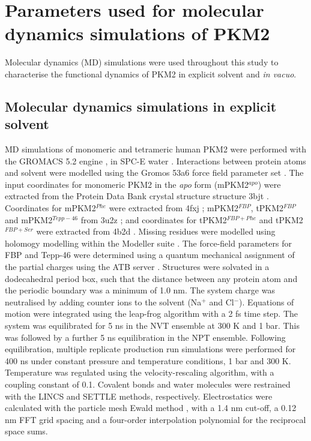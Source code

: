 \section{Parameters used for molecular dynamics simulations of PKM2}
Molecular dynamics (MD) simulations were used throughout this study to characterise the functional dynamics of PKM2 in explicit solvent and \textit{in vacuo}. 

\subsection{Molecular dynamics simulations in explicit solvent}
MD simulations of monomeric and tetrameric human PKM2 were performed with the GROMACS 5.2 engine \cite{Van-Der-Spoel:2005aa}, in SPC-E water \cite{berendsen1987missing}. Interactions between protein atoms and solvent were modelled using the Gromos 53a6 force field parameter set \cite{Oostenbrink:2004aa}. The input coordinates for monomeric PKM2 in the \textit{apo} form (mPKM2$^{apo}$) were extracted from the Protein Data Bank crystal structure structure 3bjt \cite{Christofk:2008aa}. Coordinates for mPKM2$^{Phe}$ were extracted from 4fxj \cite{Morgan:2013aa};  mPKM2$^{FBP}$, tPKM2$^{FBP}$ and mPKM2$^{Tepp-46}$ from 3u2z \cite{Anastasiou:2012aa}; and coordinates for tPKM2$^{FBP+Phe}$ and tPKM2$^{FBP+Ser}$ were extracted from 4b2d \cite{Chaneton:2012aa}. Missing residues were modelled using holomogy modelling within the Modeller suite \cite{fiser2003modeller}. The force-field parameters for FBP and Tepp-46 were determined using a quantum mechanical assignment of the partial charges using the ATB server \cite{Malde:2011aa}. Structures were solvated in a dodecahedral period box, such that the distance between any protein atom and the periodic boundary was a minimum of 1.0 nm. The system charge was neutralised by adding counter ions to the solvent (Na$^{+}$ and Cl$^{-}$). Equations of motion were integrated using the leap-frog algorithm with a 2 fs time step. The system was equilibrated for 5 ns in the NVT ensemble at 300 K and 1 bar. This was followed by a further 5 ns equilibration in the NPT ensemble. Following equilibration, multiple replicate production run simulations were performed for 400 ns under constant pressure and temperature conditions, 1 bar and 300 K. Temperature was regulated using the velocity-rescaling algorithm, with a coupling constant of 0.1. Covalent bonds and water molecules were restrained with the LINCS \cite{Hess:2008ab} and SETTLE \cite{Miyamoto:1992aa} methods, respectively. Electrostatics were calculated with the particle mesh Ewald method \cite{Darden:1993aa}, with a 1.4 nm cut-off, a 0.12 nm FFT grid spacing and a four-order interpolation polynomial for the reciprocal space sums.

